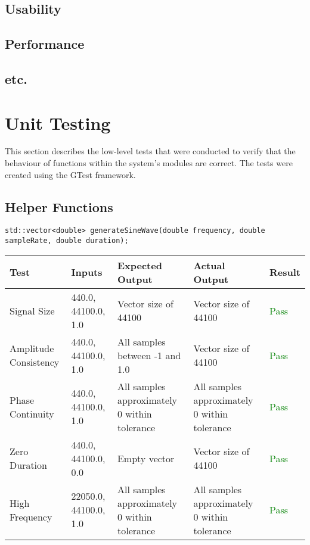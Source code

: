 \documentclass[12pt, titlepage]{article}
\begin{document}
\subsection{Usability}
		
\subsection{Performance}

\subsection{etc.}

\section{Unit Testing}

This section describes the low-level tests that were conducted to verify that the behaviour of 
functions within the system's modules are correct. The tests were created using the GTest framework.

\subsection{Helper Functions}

\texttt{std::vector<double> generateSineWave(double frequency, double sampleRate, double duration);}
\begin{longtable}{|L{3cm}|L{2cm}|L{2cm}|L{2cm}|l|}
  \hline
  \textbf{Test} & \textbf{Inputs} & \textbf{Expected Output} & \textbf{Actual Output} & \textbf{Result} \\
  \hline
  Signal Size & 440.0, 44100.0, 1.0 & Vector size of 44100 & Vector size of 44100 & \textcolor{green}{Pass} \\
  \hline
  Amplitude Consistency & 440.0, 44100.0, 1.0 & All samples between -1 and 1.0 & Vector size of 44100 & \textcolor{green}{Pass} \\
  \hline
  Phase Continuity & 440.0, 44100.0, 1.0 & All samples approximately 0 within tolerance & All samples approximately 0 within tolerance & \textcolor{green}{Pass} \\
  \hline
  Zero Duration & 440.0, 44100.0, 0.0 & Empty vector & Vector size of 44100 & \textcolor{green}{Pass} \\
  \hline
  High Frequency & 22050.0, 44100.0, 1.0 & All samples approximately 0 within tolerance & All samples approximately 0 within tolerance & \textcolor{green}{Pass} \\
  \hline
\end{longtable}
\end{document}
